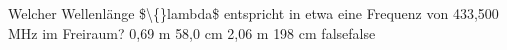     {Welcher Wellenlänge \$\textbackslash\{\}lambda\$ entspricht in etwa eine Frequenz von 433,500 MHz im Freiraum?}
    {0,69 m}
    {58,0 cm}
    {2,06 m}
    {198 cm}
    {false}{false}